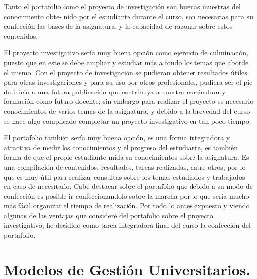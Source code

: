 \documentclass{article}
\begin{document}
{\justifying\fontsize{13}{18}\large Tanto el portafolio como el proyecto de investigación son buenas muestras del conocimiento obte-
nido por el estudiante durante el curso, son necesarias para su confección las bases de la asignatura,
y la capacidad de razonar sobre estos contenidos.

El proyecto investigativo sería muy buena opción como ejercicio de culminación, puesto que en
este se debe ampliar y estudiar más a fondo los temas que aborde el mismo. Con el proyecto de
investigación se pudieran obtener resultados útiles para otras investigaciones y para su uso por otros
profesionales, pudiera ser el pie de inicio a una futura publicación que contribuya a nuestro curriculum
y formación como futuro docente; sin embargo para realizar el proyecto es necesario conocimientos
de varios temas de la asignatura, y debido a la brevedad del curso se hace algo complicado completar
un proyecto investigativo en tan poco tiempo.

El portafolio también sería muy buena opción, es una forma integradora y atractiva de medir los
conocimientos y el progreso del estudiante, es también forma de que el propio estudiante mida su
conocimientos sobre la asignatura. Es una compilación de contenidos, resultados, tareas realizadas,
entre otros, por lo que es muy útil para realizar consultas sobre los temas estudiados y trabajados en
caso de necesitarlo. Cabe destacar sobre el portafolio que debido a su modo de confección es posible ir
confeccionandolo sobre la marcha por lo que sería mucho más fácil organizar el tiempo de realización.
Por todo lo antes expuesto y viendo algunas de las ventajas que consideré del portafolio sobre el
proyecto investigativo, he decidido como tarea integradora final del curso la confección del portafolio.}

\section*{\color{uprgreen} Modelos de Gestión Universitarios.}
\label{sec:MGU}
\end{document}
